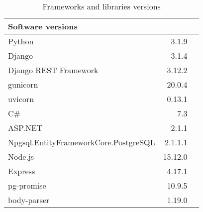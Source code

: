 \FloatBarrier
\begin{table}[!htp]\centering
    \caption{Frameworks and libraries versions}\label{tab:software}
    \scriptsize
    \begin{tabular}{lrr}\toprule
        Software versions                     &         \\\midrule
        Python                                & 3.1.9   \\
        Django                                & 3.1.4   \\
        Django REST Framework                 & 3.12.2  \\
        gunicorn                              & 20.0.4  \\
        uvicorn                               & 0.13.1  \\\midrule
        C\#                                   & 7.3     \\
        ASP.NET                               & 2.1.1   \\
        Npgsql.EntityFrameworkCore.PostgreSQL & 2.1.1.1 \\\midrule
        Node.js                               & 15.12.0 \\
        Express                               & 4.17.1  \\
        pg-promise                            & 10.9.5  \\
        body-parser                           & 1.19.0  \\
        \bottomrule
    \end{tabular}
\end{table}
\FloatBarrier

